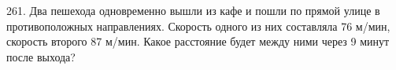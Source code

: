 261. Два пешехода одновременно вышли из кафе и пошли по прямой улице в противоположных направлениях. Скорость одного из них составляла 76 м/мин, скорость второго 87 м/мин. Какое расстояние будет между ними через 9 минут после выхода?\\
